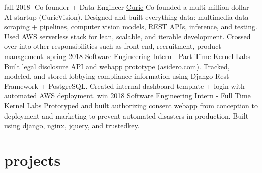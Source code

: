 \documentclass[]{friggeri-cv}
\begin{document}
\begin{entrylist}
  \entry
    {fall 2018-}
    {Co-founder + Data Engineer}
    {\href{http://www.curie.co/}{Curie}}
    {Co-founded a multi-million dollar AI startup (CurieVision). Designed and built everything data: multimedia data scraping + pipelines, computer vision models, REST APIs, inference, and testing. Used AWS serverless stack for lean, scalable, and iterable development. Crossed over into other responsibilities such as front-end, recruitment, product management.}
  \entry
    {spring 2018}
    {Software Engineering Intern - Part Time}
    {\href{http://www.kernellabs.io/}{Kernel Labs}}
    {Built legal disclosure API and webapp prototype (\href{https://asidero.com}{asidero.com}). Tracked, modeled, and stored lobbying compliance information using Django Rest Framework + PostgreSQL. Created internal dashboard template + login with automated AWS deployment.}
  \entry
    {win 2018}
    {Software Engineering Intern - Full Time}
    {\href{http://www.kernellabs.io/}{Kernel Labs}}
    {Prototyped and built authorizing consent webapp from conception to deployment and marketing to prevent automated disasters in production. Built using django, nginx, jquery, and trustedkey.}
\end{entrylist}

\section{projects}
\end{document}

